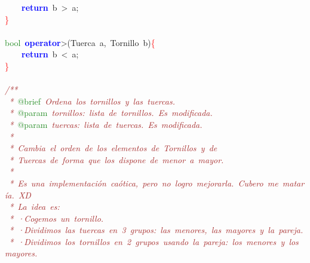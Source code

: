 \mbox{}\ \ \ \ \textbf{\textcolor{Blue}{return}}\ b\ \textcolor{BrickRed}{\textgreater{}}\ a\textcolor{BrickRed}{;} \\
\mbox{}\textcolor{Red}{\}} \\
\mbox{} \\
\mbox{}\textcolor{ForestGreen}{bool}\ \textbf{\textcolor{Blue}{operator}}\textcolor{BrickRed}{\textgreater{}(}\textcolor{TealBlue}{Tuerca}\ a\textcolor{BrickRed}{,}\ \textcolor{TealBlue}{Tornillo}\ b\textcolor{BrickRed}{)}\textcolor{Red}{\{} \\
\mbox{}\ \ \ \ \textbf{\textcolor{Blue}{return}}\ b\ \textcolor{BrickRed}{\textless{}}\ a\textcolor{BrickRed}{;} \\
\mbox{}\textcolor{Red}{\}} \\
\mbox{} \\
\mbox{}\textit{\textcolor{Brown}{/**}} \\
\mbox{}\textit{\textcolor{Brown}{\ *\ }}\textcolor{ForestGreen}{@brief}\textit{\textcolor{Brown}{\ Ordena\ los\ tornillos\ y\ las\ tuercas.}} \\
\mbox{}\textit{\textcolor{Brown}{\ *\ }}\textcolor{ForestGreen}{@param}\textit{\textcolor{Brown}{\ tornillos:\ lista\ de\ tornillos.\ Es\ modificada.}} \\
\mbox{}\textit{\textcolor{Brown}{\ *\ }}\textcolor{ForestGreen}{@param}\textit{\textcolor{Brown}{\ tuercas:\ lista\ de\ tuercas.\ Es\ modificada.}} \\
\mbox{}\textit{\textcolor{Brown}{\ *\ }} \\
\mbox{}\textit{\textcolor{Brown}{\ *\ Cambia\ el\ orden\ de\ los\ elementos\ de\ Tornillos\ y\ de}} \\
\mbox{}\textit{\textcolor{Brown}{\ *\ Tuercas\ de\ forma\ que\ los\ dispone\ de\ menor\ a\ mayor.}} \\
\mbox{}\textit{\textcolor{Brown}{\ *}} \\
\mbox{}\textit{\textcolor{Brown}{\ *\ Es\ una\ implementación\ caótica,\ pero\ no\ logro\ mejorarla.\ Cubero\ me\ mataría.\ XD}} \\
\mbox{}\textit{\textcolor{Brown}{\ *\ La\ idea\ es:}} \\
\mbox{}\textit{\textcolor{Brown}{\ *\ ·Cogemos\ un\ tornillo.}} \\
\mbox{}\textit{\textcolor{Brown}{\ *\ ·Dividimos\ las\ tuercas\ en\ 3\ grupos:\ las\ menores,\ las\ mayores\ y\ la\ pareja.}} \\
\mbox{}\textit{\textcolor{Brown}{\ *\ ·Dividimos\ los\ tornillos\ en\ 2\ grupos\ usando\ la\ pareja:\ los\ menores\ y\ los\ mayores.}} \\
